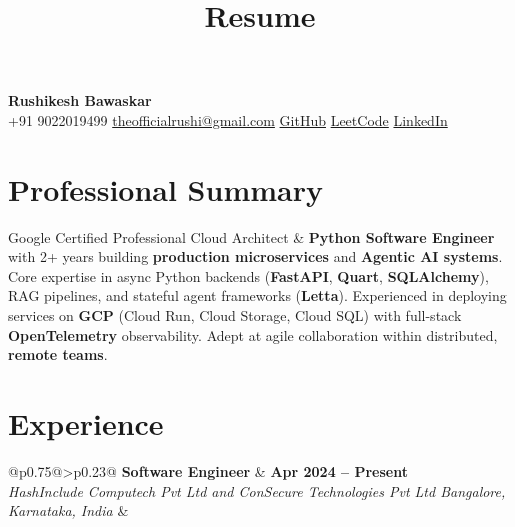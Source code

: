 \documentclass[a4paper,10pt]{article}
\title{Resume}
\date{}
\begin{document}
\vspace*{-1.1cm} %

\begin{center}
    {\LARGE\textbf{Rushikesh Bawaskar}}\\[0.3cm]
    \small
    +91 9022019499 \;
    \href{mailto:theofficialrushi@gmail.com}{theofficialrushi@gmail.com} \;
    \href{https://github.com/RushikeshBawaskar}{GitHub} \;
    \href{https://leetcode.com/Rushi_Bawaskar}{LeetCode} \;
    \href{https://linkedin.com/in/rushibawaskar}{LinkedIn}
\end{center}

\vspace{0.1cm}

\section*{Professional Summary}
Google Certified Professional Cloud Architect \& \textbf{Python Software Engineer} with 2+ years building \textbf{production microservices} and \textbf{Agentic AI systems}. Core expertise in async Python backends (\textbf{FastAPI}, \textbf{Quart}, \textbf{SQLAlchemy}), RAG pipelines, and stateful agent frameworks (\textbf{Letta}). Experienced in deploying services on \textbf{GCP} (Cloud Run, Cloud Storage, Cloud SQL) with full-stack \textbf{OpenTelemetry} observability. Adept at agile collaboration within distributed, \textbf{remote teams}.

\section*{Experience}

\begin{tabular}{@{}p{}@{\hspace{0.02\textwidth}}>{\raggedleft\arraybackslash}p{}@{}}
\textbf{Software Engineer} & \textbf{Apr 2024 – Present} \\
\textit{HashInclude Computech Pvt Ltd and ConSecure Technologies Pvt Ltd Bangalore, Karnataka, India} & \\

 \\

\end{tabular}
\end{document}

